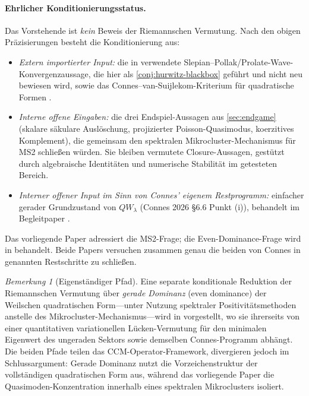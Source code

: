 \documentclass[12pt,a4paper]{article}
\theoremstyle{definition}
\theoremstyle{remark}
\newtheorem{remark}[theorem]{Bemerkung}
\begin{document}
\paragraph{Ehrlicher Konditionierungsstatus.}
Das Vorstehende ist \emph{kein} Beweis der Riemannschen Vermutung. Nach den
obigen Präzisierungen besteht die Konditionierung aus:
\begin{itemize}[leftmargin=*]
  \item \emph{Extern importierter Input:} die in \cite[Fact 6.4 /
    Theorem~1 von Ref.~47]{Connes2026} verwendete
    Slepian--Pollak/Prolate-Wave-Konvergenzaussage, die hier als
    \cref{conj:hurwitz-blackbox} geführt und nicht neu bewiesen wird,
    sowie das Connes--van-Suijlekom-Kriterium für quadratische Formen
    \cite{ConnesvS2025}.
  \item \emph{Interne offene Eingaben:} die drei Endspiel-Aussagen aus
    \cref{sec:endgame} (skalare säkulare Auslöschung, projizierter
Poisson-Quasimodus, koerzitives Komplement), die gemeinsam den
    spektralen Mikrocluster-Mechanismus für MS2 schließen würden. Sie
    bleiben vermutete Closure-Aussagen, gestützt durch algebraische
    Identitäten und numerische Stabilität im getesteten Bereich.
  \item \emph{Interner offener Input im Sinn von Connes' eigenem
    Restprogramm:} einfacher gerader Grundzustand von $QW_\lambda$
    (Connes 2026 §6.6 Punkt (i)), behandelt im Begleitpaper
    \cite{Geiger2026evendom}.
\end{itemize}
Das vorliegende Paper adressiert die MS2-Frage; die Even-Dominance-Frage
wird in \cite{Geiger2026evendom} behandelt. Beide Papers versuchen zusammen
genau die beiden von Connes in \cite[§6.6]{Connes2026} genannten
Restschritte zu schließen.

\begin{remark}[Eigenständiger Pfad]
Eine separate konditionale Reduktion der Riemannschen Vermutung über
\emph{gerade Dominanz} (even dominance) der Weilschen quadratischen Form---unter
Nutzung spektraler Positivitätsmethoden anstelle des Mikrocluster-Mechanismus---wird
in \cite{Geiger2026evendom} vorgestellt, wo sie ihrerseits von einer quantitativen
variationellen Lücken-Vermutung für den minimalen Eigenwert des ungeraden Sektors
sowie demselben Connes-Programm abhängt. Die beiden Pfade teilen das
CCM-Operator-Framework, divergieren jedoch im Schlussargument: Gerade Dominanz
nutzt die Vorzeichenstruktur der vollständigen quadratischen Form aus, während
das vorliegende Paper die Quasimoden-Konzentration innerhalb eines spektralen
Mikroclusters isoliert.
\end{remark}
\end{document}

